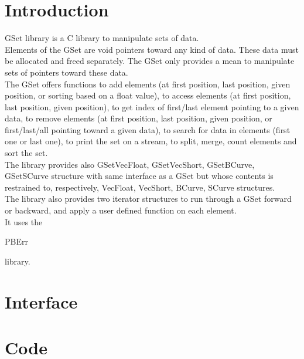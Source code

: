 \section*{Introduction}

GSet library is a C library to manipulate sets of data.\\

Elements of the GSet are void pointers toward any kind of data. These data must be allocated and freed separately. The GSet only provides a mean to manipulate sets of pointers toward these data.\\

The GSet offers functions to add elements (at first position, last position, given position, or sorting based on a float value), to access elements (at first position, last position, given position), to get index of first/last element pointing to a given data, to remove elements (at first position, last position, given position, or first/last/all pointing toward a given data), to search for data in elements (first one or last one), to print the set on a stream, to split, merge, count elements and sort the set.\\

The library provides also GSetVecFloat, GSetVecShort, GSetBCurve, GSetSCurve structure with same interface as a GSet but whose contents is restrained to, respectively, VecFloat, VecShort, BCurve, SCurve structures.\\

The library also provides two iterator structures to run through a GSet forward or backward, and apply a user defined function on each element.\\ 

It uses the \begin{ttfamily}PBErr\end{ttfamily} library.\\

\section{Interface}

\begin{scriptsize}
\begin{ttfamily}

\end{ttfamily}
\end{scriptsize}

\section{Code}

